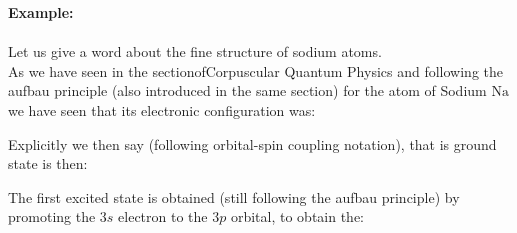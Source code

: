 	
	\begin{tcolorbox}[colframe=black,colback=white,sharp corners]
	\textbf{{\Large {}}Example:}\\\\
	Let us give a word about the fine structure of sodium atoms.\\
	
	As we have seen in the sectionofCorpuscular Quantum Physics and following the aufbau principle (also introduced in the same section) for the atom of Sodium $\mathrm{Na}$ we have seen that its electronic configuration was:
	
	Explicitly we then say (following orbital-spin coupling notation), that is ground state is then:
	
	The first excited state is obtained (still following the aufbau principle) by promoting the $3s$ electron to the $3p$ orbital, to obtain the:	
	\end{tcolorbox}
	
